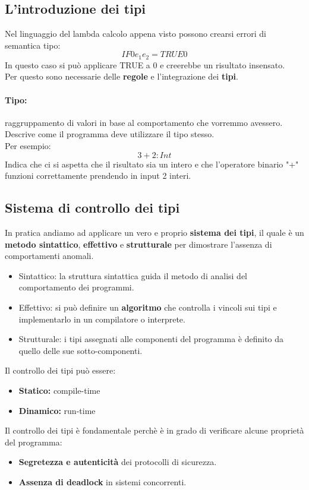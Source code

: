 \documentclass[12pt,a4paper]{article}
\begin{document}
\subsection{L'introduzione dei tipi}
Nel linguaggio del lambda calcolo appena visto possono crearsi errori di semantica tipo:
\[
IF 0 e_1 e_2 = TRUE 0
\]
In questo caso si può applicare TRUE a 0 e creerebbe un risultato insensato.\\
Per questo sono necessarie delle \textbf{regole} e l'integrazione dei \textbf{tipi}.
\paragraph{Tipo:} raggruppamento di valori in base al comportamento che vorremmo avessero. Descrive come il programma deve utilizzare il tipo stesso.\\
Per esempio:
\[
3+2: Int
\]
Indica che ci si aspetta che il risultato sia un intero e che l'operatore binario "+" funzioni correttamente prendendo in input 2 interi.\\
\subsection{Sistema di controllo dei tipi}
In pratica andiamo ad applicare un vero e proprio \textbf{sistema dei tipi}, il quale è un \textbf{metodo sintattico}, \textbf{effettivo} e \textbf{strutturale} per dimostrare l'assenza di comportamenti anomali.
\begin{itemize}
  \item Sintattico: la struttura sintattica guida il metodo di analisi del comportamento dei programmi.
  \item Effettivo: si può definire un \textbf{algoritmo} che controlla i vincoli sui tipi e implementarlo in un compilatore o interprete.
  \item Strutturale: i tipi assegnati alle componenti del programma è definito da quello delle sue sotto-componenti.
\end{itemize}
Il controllo dei tipi può essere:
\begin{itemize}
  \item \textbf{Statico:} compile-time
  \item \textbf{Dinamico:} run-time
\end{itemize}
Il controllo dei tipi è fondamentale perchè è in grado di verificare alcune proprietà del programma:
\begin{itemize}
  \item \textbf{Segretezza e autenticità} dei protocolli di sicurezza.
  \item \textbf{Assenza di deadlock} in sistemi concorrenti.
\end{itemize}
\end{document}
